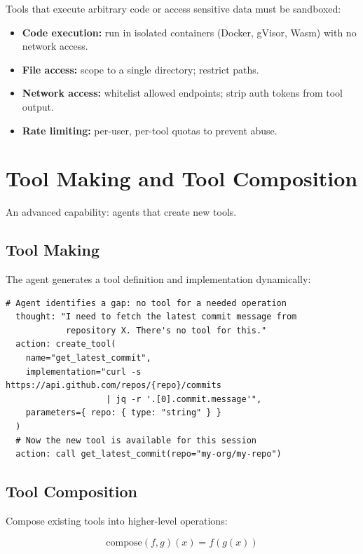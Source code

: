 Tools that execute arbitrary code or access sensitive data must be sandboxed:

\begin{itemize}
	\item \textbf{Code execution:} run in isolated containers (Docker, gVisor, Wasm) with no network access.
	\item \textbf{File access:} scope to a single directory; restrict paths.
	\item \textbf{Network access:} whitelist allowed endpoints; strip auth tokens from tool output.
	\item \textbf{Rate limiting:} per-user, per-tool quotas to prevent abuse.
\end{itemize}

\section{Tool Making and Tool Composition}

An advanced capability: agents that create new tools.

\subsection{Tool Making}

The agent generates a tool definition and implementation dynamically:

\begin{lstlisting}[caption=Tool making flow]
  # Agent identifies a gap: no tool for a needed operation
  thought: "I need to fetch the latest commit message from
            repository X. There's no tool for this."
  action: create_tool(
    name="get_latest_commit",
    implementation="curl -s https://api.github.com/repos/{repo}/commits
                    | jq -r '.[0].commit.message'",
    parameters={ repo: { type: "string" } }
  )
  # Now the new tool is available for this session
  action: call get_latest_commit(repo="my-org/my-repo")
\end{lstlisting}

\subsection{Tool Composition}

Compose existing tools into higher-level operations:

\begin{equation}
	\text{compose}(f, g)(x) = f(g(x))
\end{equation}

